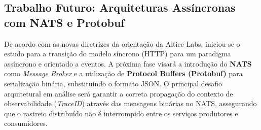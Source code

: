 \documentclass[a4paper,12pt,oneside]{article}
\begin{document}
\subsection{Trabalho Futuro: Arquiteturas Assíncronas com NATS e Protobuf}
De acordo com as novas diretrizes da orientação da Altice Labs, iniciou-se o estudo para a transição do modelo síncrono (HTTP) para um paradigma assíncrono e orientado a eventos. A próxima fase visará a introdução do \textbf{NATS} como \textit{Message Broker} e a utilização de \textbf{Protocol Buffers (Protobuf)} para serialização binária, substituindo o formato JSON. 
O principal desafio arquitetural em análise será garantir a correta propagação do contexto de observabilidade (\textit{TraceID}) através das mensagens binárias no NATS, assegurando que o rastreio distribuído não é interrompido entre os serviços produtores e consumidores.

\printbibliography
\end{document}
